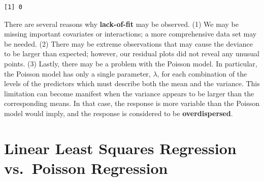 \documentclass[
]{krantz}
\begin{document}
\begin{verbatim}
[1] 0
\end{verbatim}

There are several reasons why \textbf{lack-of-fit}  may be observed. (1) We may be missing important covariates or interactions; a more comprehensive data set may be needed. (2) There may be extreme observations that may cause the deviance to be larger than expected; however, our residual plots did not reveal any unusual points. (3) Lastly, there may be a problem with the Poisson model. In particular, the Poisson model has only a single parameter, \(\lambda\), for each combination of the levels of the predictors which must describe both the mean and the variance. This limitation can become manifest when the variance appears to be larger than the corresponding means. In that case, the response is more variable than the Poisson model would imply, and the response is considered to be \textbf{overdispersed}. 

\hypertarget{linear-least-squares-regression-vs.-poisson-regression}{%
\section{\texorpdfstring{Linear Least Squares Regression  vs.~Poisson Regression }{Linear Least Squares Regression  vs.~Poisson Regression }}\label{linear-least-squares-regression-vs.-poisson-regression}}
\end{document}
